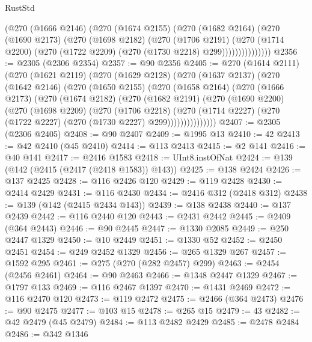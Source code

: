 \begin{lexlean}{RustStd}
\begin{coremodule}
                (@270
                  (@1666 @2146)
                  (@270
                    (@1674 @2155)
                    (@270
                      (@1682 @2164)
                      (@270
                        (@1690 @2173)
                        (@270
                          (@1698 @2182)
                          (@270
                            (@1706 @2191)
                            (@270
                              (@1714 @2200)
                              (@270 (@1722 @2209) (@270 (@1730 @2218) @299)))))))))))))))
@2356 := @2305 (@2306 @2354)
@2357 := @90 @2356
@2405 := @270
    (@1614 @2111)
    (@270
      (@1621 @2119)
      (@270
        (@1629 @2128)
        (@270
          (@1637 @2137)
          (@270
            (@1642 @2146)
            (@270
              (@1650 @2155)
              (@270
                (@1658 @2164)
                (@270
                  (@1666 @2173)
                  (@270
                    (@1674 @2182)
                    (@270
                      (@1682 @2191)
                      (@270
                        (@1690 @2200)
                        (@270
                          (@1698 @2209)
                          (@270
                            (@1706 @2218)
                            (@270
                              (@1714 @2227)
                              (@270 (@1722 @2227) (@270 (@1730 @2227) @299)))))))))))))))
@2407 := @2305 (@2306 @2405)
@2408 := @90 @2407
@2409 := @1995 @13
@2410 := 42
@2413 := @42 @2410 (@45 @2410)
@2414 := @113 @2413
@2415 := @2 @141
@2416 := @40 @141
@2417 := @2416 @1583
@2418 := UInt8.instOfNat
@2424 := @139 (@142 (@2415 (@2417 (@2418 @1583)) @143))
@2425 := @138 @2424
@2426 := @137 @2425
@2428 := @116 @2426 @120
@2429 := @119 @2428
@2430 := @2414 @2429
@2431 := @116 @2430
@2434 := @2416 @312 (@2418 @312)
@2438 := @139 (@142 (@2415 @2434 @143))
@2439 := @138 @2438
@2440 := @137 @2439
@2442 := @116 @2440 @120
@2443 := @2431 @2442
@2445 := @2409 (@364 @2443)
@2446 := @90 @2445
@2447 := @1330 @2085
@2449 := @250 @2447 @1329
@2450 := @10 @2449
@2451 := @1330 @52
@2452 := @2450 @2451
@2454 := @249 @2452 @1329
@2456 := @265 @1329 @267
@2457 := @1592 @295
@2461 := @275 (@270 (@282 @2457) @299)
@2463 := @2454 (@2456 @2461)
@2464 := @90 @2463
@2466 := @1348 @2447 @1329
@2467 := @1797 @133
@2469 := @116 @2467 @1397
@2470 := @1431 @2469
@2472 := @116 @2470 @120
@2473 := @119 @2472
@2475 := @2466 (@364 @2473)
@2476 := @90 @2475
@2477 := @103 @15
@2478 := @265 @15
@2479 := 43
@2482 := @42 @2479 (@45 @2479)
@2484 := @113 @2482 @2429
@2485 := @2478 @2484
@2486 := @342 @1346

\end{coremodule}
\end{lexlean}
